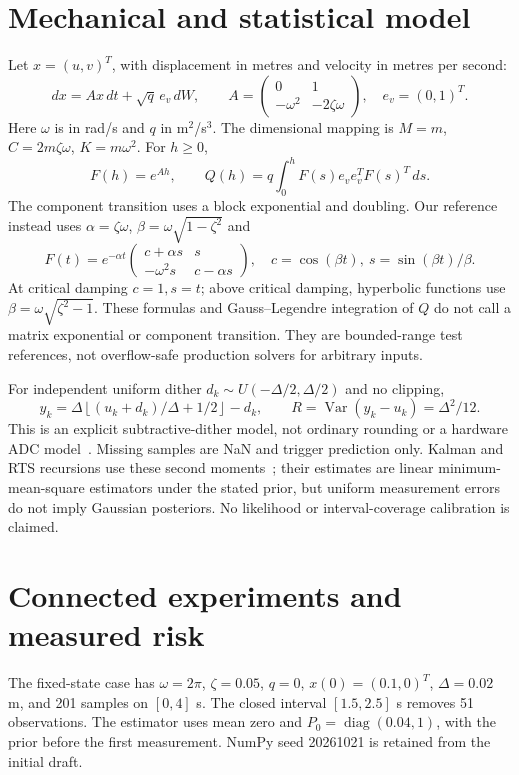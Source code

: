 \documentclass[10pt,a4paper]{article}
\begin{document}
\section{Mechanical and statistical model}
Let $x=(u,v)^T$, with displacement in metres and velocity in metres per second:
\[
 dx=A x\,dt+\sqrt q\,e_v\,dW,\qquad
 A=\begin{pmatrix}0&1\\-\omega^2&-2\zeta\omega\end{pmatrix},\quad e_v=(0,1)^T.
\]
Here $\omega$ is in rad/s and $q$ in m$^2$/s$^3$. The dimensional mapping is $M=m$, $C=2m\zeta\omega$, $K=m\omega^2$. For $h\geq0$,
\[
 F(h)=e^{Ah},\qquad Q(h)=q\int_0^h F(s)e_ve_v^TF(s)^T\,ds.
\]
The component transition uses a block exponential and doubling. Our reference instead uses $\alpha=\zeta\omega$, $\beta=\omega\sqrt{1-\zeta^2}$ and
\[
 F(t)=e^{-\alpha t}\begin{pmatrix}c+\alpha s&s\\-\omega^2s&c-\alpha s\end{pmatrix},
 \quad c=\cos(\beta t),\ s=\sin(\beta t)/\beta.
\]
At critical damping $c=1,s=t$; above critical damping, hyperbolic functions use $\beta=\omega\sqrt{\zeta^2-1}$. These formulas and Gauss--Legendre integration of $Q$ do not call a matrix exponential or component transition. They are bounded-range test references, not overflow-safe production solvers for arbitrary inputs.

For independent uniform dither $d_k\sim U(-\Delta/2,\Delta/2)$ and no clipping,
\[
 y_k=\Delta\left\lfloor (u_k+d_k)/\Delta+1/2\right\rfloor-d_k,
 \qquad R=\operatorname{Var}(y_k-u_k)=\Delta^2/12.
\]
This is an explicit subtractive-dither model, not ordinary rounding or a hardware ADC model~\cite{dither}. Missing samples are NaN and trigger prediction only. Kalman and RTS recursions use these second moments~\cite{bfs}; their estimates are linear minimum-mean-square estimators under the stated prior, but uniform measurement errors do not imply Gaussian posteriors. No likelihood or interval-coverage calibration is claimed.
\section{Connected experiments and measured risk}
The fixed-state case has $\omega=2\pi$, $\zeta=0.05$, $q=0$, $x(0)=(0.1,0)^T$, $\Delta=0.02$ m, and 201 samples on $[0,4]$ s. The closed interval $[1.5,2.5]$ s removes 51 observations. The estimator uses mean zero and $P_0=\operatorname{diag}(0.04,1)$, with the prior before the first measurement. NumPy seed 20261021 is retained from the initial draft.
\end{document}
